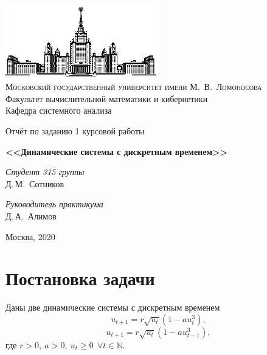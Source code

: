 \documentclass[16pt]{article}
\begin{document}
\thispagestyle{empty}

\begin{center}
\ \vspace{-3cm}

\includegraphics[width=0.5\textwidth]{msu.eps}\\
{\scshape Московский государственный университет имени М.~В.~Ломоносова}\\
Факультет вычислительной математики и кибернетики\\
Кафедра системного анализа

\vfill

{\LARGE Отчёт по заданию 1 курсовой работы}

\vspace{1cm}

{\Huge\bfseries <<Динамические системы с дискретным временем>>}
\end{center}

\vspace{1cm}

\begin{flushright}
  \large
  \textit{Студент 315 группы}\\
  Д.\,М.~Сотников

  \vspace{5mm}

  \textit{Руководитель практикума}\\
  Д.\,А.~Алимов
\end{flushright}

\vfill

\begin{center}
Москва, 2020
\end{center}

\newpage

\section{Постановка задачи}
Даны две динамические системы с дискретным временем
\begin{equation} \label{s1}
u_{t+1} = r\sqrt{u_t}(1 - au_t^3),
\end{equation}
\begin{equation} \label{s2}
u_{t+1} = r\sqrt{u_t}(1 - au_{t-1}^3),
\end{equation}
где $r > 0, \ a > 0, \ u_t \geqslant 0 \ \ \forall t  \in \mathbb{N}.$
\end{document}
